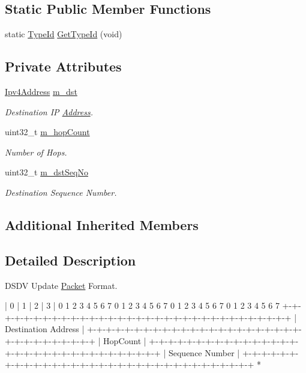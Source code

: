 \subsection*{Static Public Member Functions}
\begin{DoxyCompactItemize}
\item 
static \hyperlink{classns3_1_1TypeId}{Type\+Id} \hyperlink{classns3_1_1dsdv_1_1DsdvHeader_a2f237f2fdb9906a32b0984bf02fed488}{Get\+Type\+Id} (void)
\end{DoxyCompactItemize}
\subsection*{Private Attributes}
\begin{DoxyCompactItemize}
\item 
\hyperlink{classns3_1_1Ipv4Address}{Ipv4\+Address} \hyperlink{classns3_1_1dsdv_1_1DsdvHeader_a5be401a7d36dfdb792db8517d02e41e4}{m\+\_\+dst}
\begin{DoxyCompactList}\small\item\em Destination IP \hyperlink{classns3_1_1Address}{Address}. \end{DoxyCompactList}\item 
uint32\+\_\+t \hyperlink{classns3_1_1dsdv_1_1DsdvHeader_a0dfed4a5a4e57f4bc8604c036826332e}{m\+\_\+hop\+Count}
\begin{DoxyCompactList}\small\item\em Number of Hops. \end{DoxyCompactList}\item 
uint32\+\_\+t \hyperlink{classns3_1_1dsdv_1_1DsdvHeader_aa2c81a2f81c22a8148a7daeb8c0d757c}{m\+\_\+dst\+Seq\+No}
\begin{DoxyCompactList}\small\item\em Destination Sequence Number. \end{DoxyCompactList}\end{DoxyCompactItemize}
\subsection*{Additional Inherited Members}


\subsection{Detailed Description}
D\+S\+DV Update \hyperlink{classns3_1_1Packet}{Packet} Format. 

\begin{DoxyVerb}|      0        |      1        |      2        |       3       |
 0 1 2 3 4 5 6 7 0 1 2 3 4 5 6 7 0 1 2 3 4 5 6 7 0 1 2 3 4 5 6 7
+-+-+-+-+-+-+-+-+-+-+-+-+-+-+-+-+-+-+-+-+-+-+-+-+-+-+-+-+-+-+-+-+
|                      Destination Address                      |
+-+-+-+-+-+-+-+-+-+-+-+-+-+-+-+-+-+-+-+-+-+-+-+-+-+-+-+-+-+-+-+-+
|                            HopCount                           |
+-+-+-+-+-+-+-+-+-+-+-+-+-+-+-+-+-+-+-+-+-+-+-+-+-+-+-+-+-+-+-+-+
|                       Sequence Number                         |
+-+-+-+-+-+-+-+-+-+-+-+-+-+-+-+-+-+-+-+-+-+-+-+-+-+-+-+-+-+-+-+-+
* \end{DoxyVerb}
 

